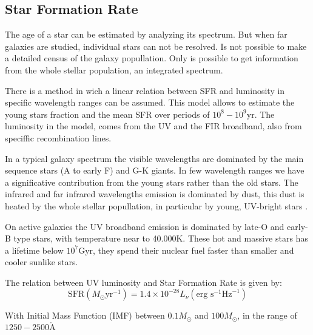 \subsection{Star Formation Rate}

The age of a star can be estimated by analyzing its spectrum. But when far
galaxies are studied, individual stars can not be resolved. Is not 
possible to make a detailed census of the galaxy popullation. Only is possible 
to get information from the whole stellar population, an integrated spectrum.

There is a  method\citep{madau98} in wich a linear relation between SFR
and luminosity in specific wavelength ranges can be assumed. This model allows
to estimate the young stars fraction and the mean SFR over periods of $10^8 -
10^9 \textrm{yr}$\citep{kennicutt98}. The luminosity in the model, comes from
the UV and the FIR broadband, also from speciffic recombination lines.



In a typical galaxy spectrum the visible wavelengths are dominated by the main 
sequence stars (A to early F) and G-K giants. In few wavelength ranges we have 
a significative contribution from the young stars rather than the old stars. 
The infrared and far infrared wavelengths emission is dominated by dust, this 
dust is  heated by the whole stellar popullation, in particular by young, 
UV-bright stars \citep{law11}.

On active galaxies the UV broadband emission is dominated by late-O
and early-B type stars, with temperature near to 40.000K. These hot and massive
stars has a lifetime below $10^7\textrm{Gyr}$, they spend their nuclear fuel
faster than smaller and cooler sunlike stars.

The relation between UV luminosity and Star Formation Rate
\citep{madau98,kennicutt98} 
is given by:
\begin{equation}
 \textrm{SFR}\left(M_\odot \textrm{yr}^{-1}\right) 
      = 1.4 \times 10^{-28} L_{\nu} \left( \textrm{erg s}^{-1}\textrm{Hz}^{-1} 
	\right)
\end{equation}


  With Initial Mass Function (IMF) between $0.1 M_\odot$ 
 and $100 M_\odot$, in the range of $1250-2500 \mathring{\textrm{A}} $

